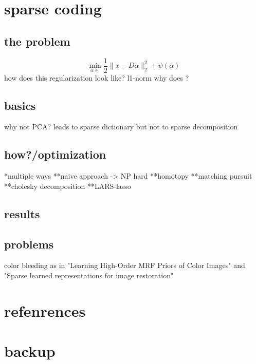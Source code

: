 \section{sparse coding}
\begin{frame}
\end{frame}
\subsection{the problem}
\begin{frame}
\[ 
\min_{\alpha\in} \frac{1}{2} \lVert x - D\alpha \rVert^{2}_{2} + \psi(\alpha)
\] 
how does this regularization look like?
l1-norm
why does ?
\end{frame}
\subsection{basics}
\begin{frame}
why not PCA? leads to sparse dictionary but not to sparse decomposition
\end{frame}

\subsection{how?/optimization}
\begin{frame}
*multiple ways
**naive approach -> NP hard
**homotopy
**matching pursuit
**cholesky decomposition
**LARS-lasso
\end{frame}

\subsection{results}
\begin{frame}
\end{frame}

\subsection{problems}
\begin{frame}
color bleeding as in "Learning High-Order MRF Priors of Color Images" and "Sparse learned representations for image restoration"
\end{frame}

\section{refenrences}
\begin{frame}
\end{frame}

\section{backup}
\begin{frame}
\end{frame}
